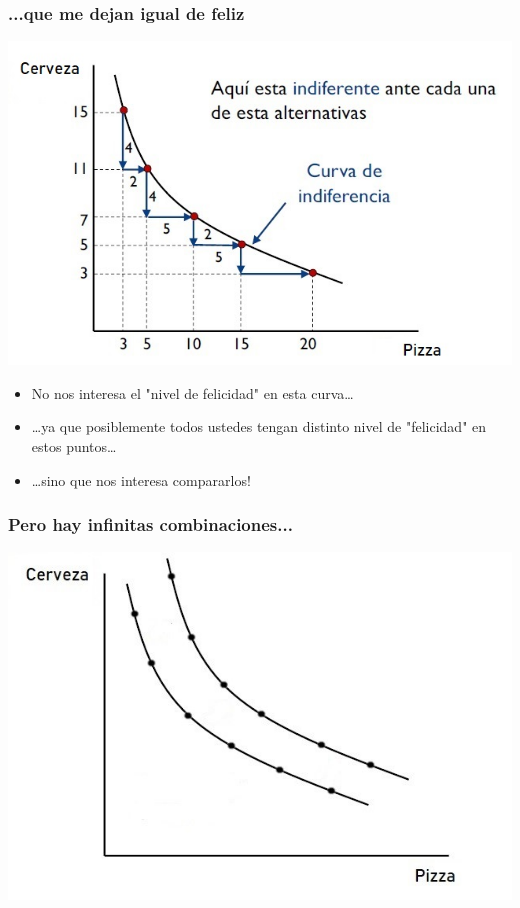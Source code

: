\documentclass{beamer}
\begin{document}
\begin{frame}
\frametitle{...que me dejan igual de feliz}
\centering
\includegraphics[scale=0.55]{../Figures/Tema_02.13_rp11.jpg}
\begin{itemize}
    \item No nos interesa el "nivel de felicidad" en esta curva\dots
    \item \dots ya que posiblemente todos ustedes tengan distinto nivel de "felicidad" en estos puntos\dots
    \item \dots sino que nos interesa compararlos!
\end{itemize}
\end{frame}

\begin{frame}
\frametitle{Pero hay infinitas combinaciones...}
\centering
\includegraphics[scale=0.6]{../Figures/Tema_02.15_rp12.jpg}
\end{frame}
\end{document}

